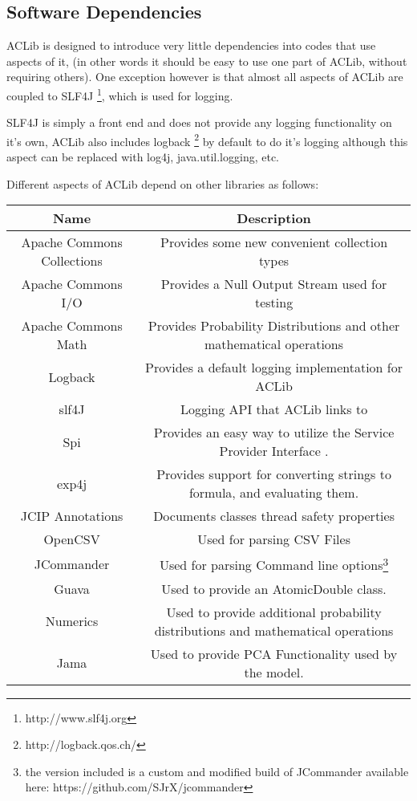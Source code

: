 \documentclass[11pt,letterpaper,oneside]{article}
\begin{document}
\subsection{Software Dependencies}

ACLib is designed to introduce very little dependencies into codes that use aspects of it, (in other words it should be easy to use one part of ACLib, without requiring others). One exception however is that almost all aspects of ACLib are coupled to SLF4J \footnote{http://www.slf4j.org}, which is used for logging.

SLF4J is simply a front end and does not provide any logging functionality on it's own, ACLib also includes logback \footnote{http://logback.qos.ch/} by default to do it's logging although this aspect can be replaced with log4j, java.util.logging, etc.

Different aspects of ACLib depend on other libraries as follows:

\begin{tabular}{c c }
Name & Description  \\

\hline
\hline
Apache Commons Collections & Provides some new convenient collection types \\
Apache Commons I/O & Provides a Null Output Stream used for testing \\
Apache Commons Math & Provides Probability Distributions and other mathematical operations \\
Logback & 	Provides a default logging implementation for ACLib \\
slf4J & Logging API that ACLib links to \\
Spi & Provides an easy way to utilize the Service Provider Interface . \\
exp4j & Provides support for converting strings to formula, and evaluating them. \\
JCIP Annotations & Documents classes thread safety properties \\
OpenCSV & Used for parsing CSV Files \\
JCommander & Used for parsing Command line options\footnote{the version included is a custom and modified build of JCommander available here: https://github.com/SJrX/jcommander} \\
Guava & Used to provide an AtomicDouble class. \\ 
Numerics & Used to provide additional probability distributions and mathematical operations \\
Jama & Used to provide PCA Functionality used by the model. \\



\end{tabular}
\end{document}

